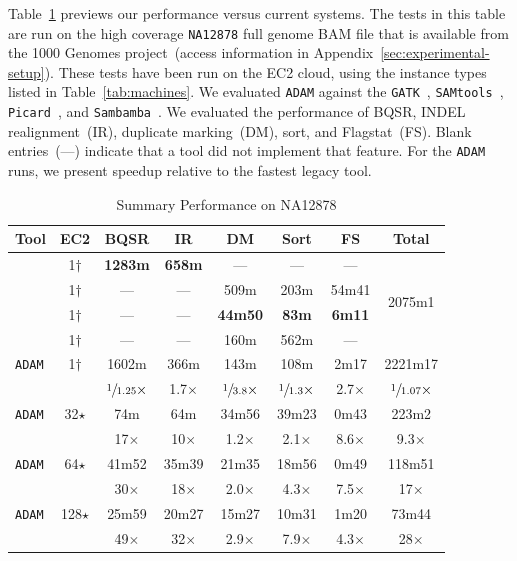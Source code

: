 \documentclass{acm_proc_article-sp}
\begin{document}
Table~\ref{tab:overview} previews our performance versus current systems. The tests in this table are run on the
high coverage \texttt{NA12878} full genome BAM file that is available from the 1000 Genomes
project~(access information in Appendix~\ref{sec:experimental-setup}). These tests have been run on the EC2 cloud,
using the instance types listed in
Table~\ref{tab:machines}. We evaluated \texttt{ADAM} against the \texttt{GATK}~\cite{depristo11},
\texttt{SAMtools}~\cite{li11}, \texttt{Picard}~\cite{picard}, and \texttt{Sambamba}~\cite{tarasov15}. We evaluated
the performance of BQSR, INDEL realignment~(IR), duplicate marking~(DM), sort, and Flagstat~(FS). Blank
entries~(---) indicate that a tool did not implement that feature. For the \texttt{ADAM} runs, we present
speedup relative to the fastest legacy tool.

\begin{table}[h]
\centering
\tiny
\caption{Summary Performance on NA12878}
\label{tab:overview}
\begin{tabular}{ l | c | c c c c c | c }
\hline
\bf Tool & \bf EC2 & \bf BQSR & \bf IR & \bf DM & \bf Sort & \bf FS & \bf Total \\
\hline
\hline
\cite{depristo11} & 1$\dagger$ & \bf 1283m & \bf 658m & --- & --- & --- & \multirow{4}{*}{2075m1} \\
\cite{li11} & 1$\dagger$ & --- & --- & 509m & 203m & 54m41 & \\
\cite{tarasov15} & 1$\dagger$ & --- & --- & \bf 44m50 & \bf 83m & \bf 6m11 & \\
\cite{picard} & 1$\dagger$ & --- & --- & 160m & 562m & --- & \\
\hline
\texttt{ADAM} & 1$\dagger$ & 1602m & 366m & 143m & 108m & 2m17 & 2221m17 \\
 & & $\sfrac{1}{1.25}\times$ & 1.7$\times$ & $\sfrac{1}{3.8}\times$ & $\sfrac{1}{1.3}\times$ & 2.7$\times$ & $\sfrac{1}{1.07}\times$ \\
\hline
\texttt{ADAM} & 32$\star$ & 74m & 64m & 34m56 & 39m23 & 0m43 & 223m2 \\
 & & 17$\times$ & 10$\times$ & 1.2$\times$ & 2.1$\times$ & 8.6$\times$ & 9.3$\times$ \\
\hline
\texttt{ADAM} & 64$\star$ & 41m52 & 35m39 & 21m35 & 18m56 & 0m49 & 118m51 \\
 & & 30$\times$ & 18$\times$ & 2.0$\times$ & 4.3$\times$ & 7.5$\times$ & 17$\times$ \\
\hline
\texttt{ADAM} & 128$\star$ & 25m59 & 20m27 & 15m27 & 10m31 & 1m20 & 73m44 \\
 & & 49$\times$ & 32$\times$ & 2.9$\times$ & 7.9$\times$ & 4.3$\times$ & 28$\times$ \\
\end{tabular}
\end{table}
\end{document}
